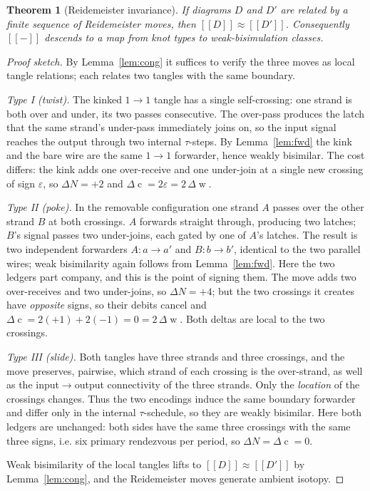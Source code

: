 \documentclass[11pt]{article}
\newtheorem{theorem}{Theorem}
\theoremstyle{definition}
\newcommand{\enc}[1]{[\![ #1 ]\!]}
\newcommand{\wbisim}{\approx}
\newcommand{\writhe}{\operatorname{w}}
\newcommand{\cost}{\operatorname{c}}
\begin{document}
\begin{theorem}[Reidemeister invariance]\label{thm:main}
If diagrams $D$ and $D'$ are related by a finite sequence of Reidemeister moves,
then $\enc{D}\wbisim\enc{D'}$. Consequently $\enc{-}$ descends to a map from knot
types to weak-bisimulation classes.
\end{theorem}
\begin{proof}[Proof sketch]
By Lemma~\ref{lem:cong} it suffices to verify the three moves as local tangle
relations; each relates two tangles with the same boundary.

\emph{Type I (twist).} The kinked $1\!\to\!1$ tangle has a single self-crossing:
one strand is both over and under, its two passes consecutive. The over-pass
produces the latch that the same strand's under-pass immediately joins on, so the
input signal reaches the output through two internal $\tau$-steps. By
Lemma~\ref{lem:fwd} the kink and the bare wire are the same $1\!\to\!1$ forwarder,
hence weakly bisimilar. The cost differs: the kink adds one over-receive and one
under-join at a single new crossing of sign $\varepsilon$, so
$\Delta N = +2$ and $\Delta\cost = 2\varepsilon = 2\,\Delta\writhe$.

\emph{Type II (poke).} In the removable configuration one strand $A$ passes over
the other strand $B$ at both crossings. $A$ forwards straight through, producing
two latches; $B$'s signal passes two under-joins, each gated by one of $A$'s
latches. The result is two independent forwarders $A\colon a\!\to\!a'$ and
$B\colon b\!\to\!b'$, identical to the two parallel wires; weak bisimilarity again
follows from Lemma~\ref{lem:fwd}. Here the two ledgers part company, and this is
the point of signing them. The move adds two over-receives and two under-joins, so
$\Delta N=+4$; but the two crossings it creates have \emph{opposite} signs, so
their debits cancel and $\Delta\cost = 2(+1)+2(-1) = 0 = 2\,\Delta\writhe$. Both
deltas are local to the two crossings.

\emph{Type III (slide).} Both tangles have three strands and three crossings, and
the move preserves, pairwise, which strand of each crossing is the over-strand, as
well as the input$\to$output connectivity of the three strands. Only the
\emph{location} of the crossings changes. Thus the two encodings induce the same
boundary forwarder and differ only in the internal $\tau$-schedule, so they are
weakly bisimilar. Here both ledgers are unchanged: both sides have the same three
crossings with the same three signs, i.e. six primary rendezvous per period, so
$\Delta N=\Delta\cost=0$.

Weak bisimilarity of the local tangles lifts to $\enc{D}\wbisim\enc{D'}$ by
Lemma~\ref{lem:cong}, and the Reidemeister moves generate ambient isotopy.
\end{proof}
\end{document}
